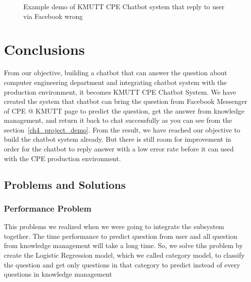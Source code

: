 \documentclass[12pt,oneside,openright,a4paper]{cpe-english-project}
\begin{document}
\begin{figure}[!h]\centering
{}
\caption{Example demo of KMUTT CPE Chatbot system that reply to user via Facebook wrong}
\label{fig:demo_chat_wrong}
\end{figure}

\chapter{Conclusions}

From our objective, building a chatbot that can answer the question about computer engineering department
and integrating chatbot system with the production environment, it becomes KMUTT CPE Chatbot System.
We have created the system that chatbot can bring the question from Facebook Messenger of CPE @ KMUTT page
to predict the question, get the answer from knowledge management, and return it back to chat successfully
as you can see from the section~\ref*{ch4_project_demo}.
From the result, we have reached our objective to build the chatbot system already.
But there is still room for improvement in order
for the chatbot to reply answer with a low error rate before it can used with the CPE production environment.

\section{Problems and Solutions}
\subsection{Performance Problem}
This problems we realized when we were going to integrate the subsystem together.
The time performance to predict question from user and all question from knowledge management
will take a long time. So, we solve tihs problem by create the Logistic Regression model,
which we called category model, to classify the question and get only questions in that
category to predict instead of every questions in knowledge management
\end{document}

